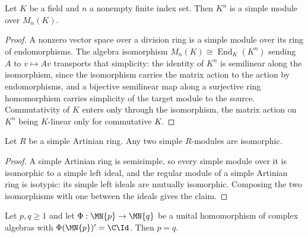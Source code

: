 \begin{lemma}%
    \label{lem:matrix_defining_module_simple}
    \leanok
    Let $K$ be a field and $n$ a nonempty finite index set. Then $K^n$ is a
    simple module over $M_n(K)$.
\end{lemma}

\begin{proof}
    \leanok
    A nonzero vector space over a division ring is a simple module over its
    ring of endomorphisms. The algebra isomorphism
    $M_n(K)\cong\operatorname{End}_K(K^n)$ sending $A$ to $v\mapsto Av$
    transports that simplicity: the identity of $K^n$ is semilinear along the
    isomorphism, since the isomorphism carries the matrix action to the
    action by endomorphisms, and a bijective semilinear map along a surjective
    ring homomorphism carries simplicity of the target module to the source.
    Commutativity of $K$ enters only through the isomorphism, the matrix
    action on $K^n$ being $K$-linear only for commutative $K$.
\end{proof}

\begin{lemma}%
    \label{lem:simple_artinian_simple_modules_isomorphic}
    \leanok
    Let $R$ be a simple Artinian ring. Any two simple $R$-modules are
    isomorphic.
\end{lemma}

\begin{proof}
    \leanok
    A simple Artinian ring is semisimple, so every simple module over it is
    isomorphic to a simple left ideal, and the regular module of a simple
    Artinian ring is isotypic: its simple left ideals are mutually isomorphic.
    Composing the two isomorphisms with one between the ideals gives the
    claim.
\end{proof}

\begin{theorem}%
    \label{thm:matrix_alg_hom_size_eq_of_scalar_relative_commutant}
    \leanok
    Let $p,q\geq1$ and let $\Phi:\MN{p}\to\MN{q}$ be a unital homomorphism of
    complex algebras with $\Phi(\MN{p})'=\C\Id$. Then $p=q$.
\end{theorem}

